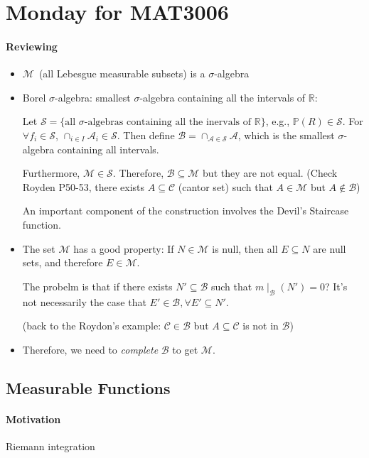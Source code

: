 
\section{Monday for MAT3006}

\paragraph{Reviewing}
\begin{itemize}
\item
$\mathcal{M}$~(all Lebesgue measurable subsets) is a $\sigma$-algebra
\item
Borel $\sigma$-algebra: smallest $\sigma$-algebra containing all the intervals of $\mathbb{R}$:

Let $\mathcal{S}=\{\text{all $\sigma$-algebras containing all the inervals of $\mathbb{R}$}\}$,
e.g., $\mathbb{P}(R)\in\mathcal{S}$.
For $\forall f_i\in\mathcal{S}$, $\cap_{i\in I}\mathcal{A}_i\in\mathcal{S}$.
Then define $\mathcal{B}=\cap_{\mathcal{A}\in\mathcal{S}}\mathcal{A}$, which is the smallest $\sigma$-algebra containing all intervals.

Furthermore, $\mathcal{M}\in\mathcal{S}$. Therefore, $\mathcal{B}\subseteq\mathcal{M}$ but they are not equal.
(Check Royden P50-53, there exists $A\subseteq\mathcal{C}$ (cantor set) such that $A\in\mathcal{M}$ but $A\notin\mathcal{B}$)

An important component of the construction involves the Devil's Staircase function.
\item
The set $\mathcal{M}$ has a good property: If $N\in\mathcal{M}$ is null, then all $E\subseteq N$ are null sets, and therefore
$E\in\mathcal{M}$.

The probelm is that if there exists $N'\subseteq\mathcal{B}$ such that $m\mid_{\mathcal{B}}(N')=0$?
It's not necessarily the case that $E'\in\mathcal{B},\forall E'\subseteq N'$.

(back to the Roydon's example: $\mathcal{C}\in\mathcal{B}$ but $A\subseteq\mathcal{C}$ is not in $\mathcal{B}$)
\item
Therefore, we need to \emph{complete} $\mathcal{B}$ to get $\mathcal{M}$.
\end{itemize}

\subsection{Measurable Functions}
\paragraph{Motivation}
Riemann integration

